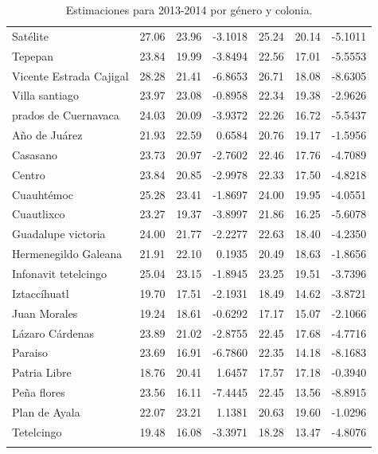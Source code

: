 \documentclass[]{article}
\begin{document}
\begin{longtable}[c]{@{}lrrrrrr@{}}
Satélite & 27.06 & 23.96 & -3.1018 & 25.24 & 20.14 & -5.1011
\\\addlinespace
Tepepan & 23.84 & 19.99 & -3.8494 & 22.56 & 17.01 & -5.5553
\\\addlinespace
Vicente Estrada Cajigal & 28.28 & 21.41 & -6.8653 & 26.71 & 18.08 &
-8.6305
\\\addlinespace
Villa santiago & 23.97 & 23.08 & -0.8958 & 22.34 & 19.38 & -2.9626
\\\addlinespace
prados de Cuernavaca & 24.03 & 20.09 & -3.9372 & 22.26 & 16.72 & -5.5437
\\\addlinespace
Año de Juárez & 21.93 & 22.59 & 0.6584 & 20.76 & 19.17 & -1.5956
\\\addlinespace
Casasano & 23.73 & 20.97 & -2.7602 & 22.46 & 17.76 & -4.7089
\\\addlinespace
Centro & 23.84 & 20.85 & -2.9978 & 22.33 & 17.50 & -4.8218
\\\addlinespace
Cuauhtémoc & 25.28 & 23.41 & -1.8697 & 24.00 & 19.95 & -4.0551
\\\addlinespace
Cuautlixco & 23.27 & 19.37 & -3.8997 & 21.86 & 16.25 & -5.6078
\\\addlinespace
Guadalupe victoria & 24.00 & 21.77 & -2.2277 & 22.63 & 18.40 & -4.2350
\\\addlinespace
Hermenegildo Galeana & 21.91 & 22.10 & 0.1935 & 20.49 & 18.63 & -1.8656
\\\addlinespace
Infonavit tetelcingo & 25.04 & 23.15 & -1.8945 & 23.25 & 19.51 & -3.7396
\\\addlinespace
Iztaccíhuatl & 19.70 & 17.51 & -2.1931 & 18.49 & 14.62 & -3.8721
\\\addlinespace
Juan Morales & 19.24 & 18.61 & -0.6292 & 17.17 & 15.07 & -2.1066
\\\addlinespace
Lázaro Cárdenas & 23.89 & 21.02 & -2.8755 & 22.45 & 17.68 & -4.7716
\\\addlinespace
Paraiso & 23.69 & 16.91 & -6.7860 & 22.35 & 14.18 & -8.1683
\\\addlinespace
Patria Libre & 18.76 & 20.41 & 1.6457 & 17.57 & 17.18 & -0.3940
\\\addlinespace
Peña flores & 23.56 & 16.11 & -7.4445 & 22.45 & 13.56 & -8.8915
\\\addlinespace
Plan de Ayala & 22.07 & 23.21 & 1.1381 & 20.63 & 19.60 & -1.0296
\\\addlinespace
Tetelcingo & 19.48 & 16.08 & -3.3971 & 18.28 & 13.47 & -4.8076
\\\addlinespace
\bottomrule
\addlinespace
\caption{Estimaciones para 2013-2014 por género y colonia.}
\end{longtable}
\end{document}
